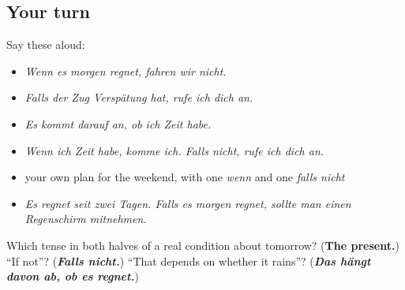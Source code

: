 \subsection*{Your turn}
Say these aloud:

\begin{itemize}
\raggedright
  \item \emph{Wenn es morgen regnet, fahren wir nicht.}
  \item \emph{Falls der Zug Verspätung hat, rufe ich dich an.}
  \item \emph{Es kommt darauf an, ob ich Zeit habe.}
  \item \emph{Wenn ich Zeit habe, komme ich. Falls nicht, rufe ich dich an.}
  \item your own plan for the weekend, with one \emph{wenn} and one \emph{falls nicht}
  \item \emph{Es regnet seit zwei Tagen. Falls es morgen regnet, sollte man einen Regenschirm mitnehmen.}
\end{itemize}

\begin{tcolorbox}[breakable,colback=teal!4,colframe=teal!35!black,title={Before you move on}]
Which tense in both halves of a real condition about tomorrow? (\textbf{The present.}) \textquotedblleft{}If not\textquotedblright{}? (\emph{\textbf{Falls nicht.}}) \textquotedblleft{}That depends on whether it rains\textquotedblright{}? (\emph{\textbf{Das hängt davon ab, ob es regnet.}})
\end{tcolorbox}

